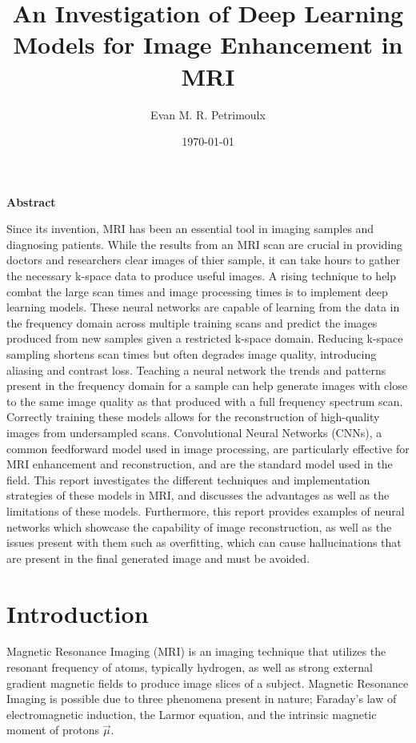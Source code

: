 \documentclass[14pt]{extreport}
\title{An Investigation of Deep Learning Models for Image Enhancement in MRI}
\author{Evan M. R. Petrimoulx}
\date{\today}
\renewenvironment{abstract}{
    \begin{center}
        \bfseries Abstract
    \end{center}
    \vspace{-1em} %
    \itshape
}{}
\begin{document}
    \maketitle
    \setcounter{page}{2}
    \vspace{-2cm}
    \begin{abstract}
        \indent Since its invention, MRI has been an essential tool in imaging samples and diagnosing patients. While the results from an MRI scan are crucial in providing doctors and researchers clear images of thier sample, it can take hours to gather the necessary k-space data to produce useful images. A rising technique to help combat the large scan times and image processing times is to implement deep learning models. These neural networks are capable of learning from the data in the frequency domain across multiple training scans and predict the images produced from new samples given a restricted k-space domain. Reducing k-space sampling shortens scan times but often degrades image quality, introducing aliasing and contrast loss. Teaching a neural network the trends and patterns present in the frequency domain for a sample can help generate images with close to the same image quality as that produced with a full frequency spectrum scan. Correctly training these models allows for the reconstruction of high-quality images from undersampled scans. Convolutional Neural Networks (CNNs), a common feedforward model used in image processing, are particularly effective for MRI enhancement and reconstruction, and are the standard model used in the field. This report investigates the different techniques and implementation strategies of these models in MRI, and discusses the advantages as well as the limitations of these models. Furthermore, this report provides examples of neural networks which showcase the capability of image reconstruction, as well as the issues present with them such as overfitting, which can cause hallucinations that are present in the final generated image and must be avoided.
    \end{abstract}

    \section*{Introduction}
        \indent Magnetic Resonance Imaging (MRI) is an imaging technique that utilizes the resonant frequency of atoms, typically hydrogen, as well as strong external gradient magnetic fields to produce image slices of a subject. Magnetic Resonance Imaging is possible due to three phenomena present in nature; Faraday's law of electromagnetic induction, the Larmor equation, and the intrinsic magnetic moment of protons $\vec{\mu}$.
        
\end{document}
